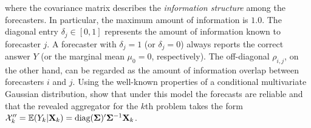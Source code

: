 \documentclass[11pt]{article}
\newcommand{\E}{\mathbb{E}}
\theoremstyle{definition}
\theoremstyle{definition}
\def\bSigma{{\bf \Sigma}}
\def\X{{\bf X}}
\def\E{{\mathbb E}}
\def\diag{\text{diag}}
\def\diag{\text{diag}}
\begin{document}
where the covariance matrix describes the \textit{information structure} among the forecasters. In particular, the maximum amount of information is $1.0$. The diagonal entry $\delta_j \in [0,1]$ represents the amount of information known to forecaster $j$. A forecaster with $\delta_j = 1$ (or $\delta_j = 0$) always reports the correct answer $Y$ (or the marginal mean $\mu_0 = 0$, respectively). The off-diagonal $\rho_{i,j}$, on the other hand, can be regarded as the amount of information overlap between forecasters $i$ and $j$. Using the  well-known properties of a conditional multivariate Gaussian distribution, \cite{satopaamodeling2, satopaamodeling} show that under this model the forecasts are reliable
%
and that the revealed aggregator for the $k$th problem takes the form  $\mathcal{X}_k''  = \E(Y_k | \X_k) = \diag(\bSigma)'\bSigma^{-1}\X_k$. 


\end{document}
